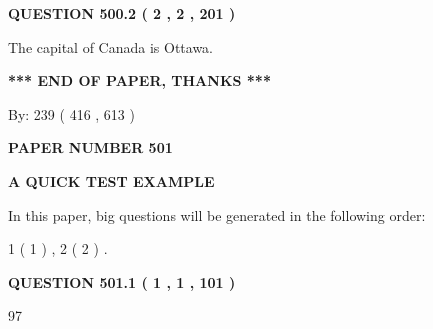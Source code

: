 \documentclass[12pt]{article}
\begin{document}
{\textbf{\Large{QUESTION
500.2 
 ( 2 , 2 , 201 )
}}}
  
  
 
 
\noindent{}
 
 
The capital of Canada is Ottawa.
 
 
 
 
   
   
 \vspace{0.2in}
 
   
   
   
   
\vspace{1.0in} 
{\textbf{\large{ *** END OF PAPER, THANKS *** }}} 
   
   
\hspace{1.0in} By: 
 239 ( 416 ,  613 )
   
   
   
   
\newpage 
\setcounter{page}{ 
   501001 } 
   
   
   
   
 {\textbf{ \Large{ PAPER NUMBER  501  }}}
   
   
\vspace{0.2in}
   
   
   
   
   
   
 \vspace{0.2in}
{\LARGE {\textbf{ A QUICK TEST EXAMPLE}}}
   
   
   
\vspace{0.2in}
   
In this paper, big questions will be generated in the following order: 
   
   
   1 ( 1 )
 ,
   2 ( 2 )
 .
  
\vspace{0.2in}
  
{\textbf{\Large{QUESTION
501.1 
 ( 1 , 1 , 101 )
}}}
  
  
 
 
\noindent{}

97
 
 
 
 
\noindent{}
\end{document}
